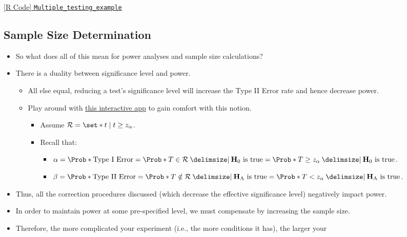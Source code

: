 \href{https://github.com/Hextical/university-notes/blob/master/year-3/semester-3/STAT 430/code/W4/Multiple_testing_example.R}{[R Code] \texttt{Multiple\_testing\_example}}
\subsection{Sample Size Determination}
\begin{itemize}
      \item So what does all of this mean for power analyses and sample size calculations?
      \item There is a duality between significance level and power.
            \begin{itemize}
                  \item All else equal, reducing a test's significance level will increase the Type II Error rate and hence
                        decrease power.
                  \item Play around with \href{https://nathaniel-t-stevens.shinyapps.io/ErrorIllustrator/}{this interactive app} to gain comfort with this notion.
                        \begin{itemize}
                              \item Assume $ \mathcal{R}=\set*{t\mid t\ge z_\alpha} $.
                              \item Recall that: \begin{itemize}
                                          \item $ \alpha=\Prob*{\text{Type I Error}}=\Prob*{T\in\mathcal{R}\given \text{$ \mathbf{H}_0 $ is true}}=\Prob*{T\ge z_\alpha\given \text{$ \mathbf{H}_0 $ is true}}$.
                                          \item $ \beta=\Prob*{\text{Type II Error}}=\Prob*{T\notin\mathcal{R}\given \text{$ \mathbf{H}_\text{A} $ is true}}=\Prob*{T< z_\alpha\given \text{$ \mathbf{H}_\text{A} $ is true}} $.
                                    \end{itemize}
                        \end{itemize}
            \end{itemize}
      \item Thus, all the correction procedures discussed (which decrease the effective significance level)
            negatively impact power.
      \item In order to maintain power at some pre-specified level, we must compensate by increasing the sample
            size.
      \item Therefore, the more complicated your experiment (i.e., the more conditions it has), the larger your

\end{itemize}
